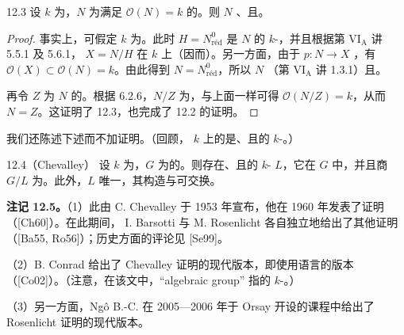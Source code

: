 \begin{SGAresult}{}{12.3}
设 $k$ 为，$N$ 为满足 $\mathcal O(N)=k$ 的。则 $N$ 、且。
\end{SGAresult}
\begin{proof}
事实上，可假定 $k$ 为。此时 $H=N^0_{\mathrm{r\text{é}d}}$ 是 $N$ 的 $k$-，并且根据第 VI$_{\mathrm A}$ 讲 5.5.1 及 5.6.1， $X=N/H$ 在 $k$ 上（因而）。另一方面，由于 $p:N\to X$ ，有 $\mathcal O(X)\subset\mathcal O(N)=k$。由此得到 $N=N^0_{\mathrm{r\text{é}d}}$，所以 $N$ （第 VI$_{\mathrm A}$ 讲 1.3.1）且。

再令 $Z$ 为 $N$ 的。根据 6.2.6，$N/Z$ 为，与上面一样可得 $\mathcal O(N/Z)=k$，从而 $N=Z$。这证明了 12.3，也完成了 12.2 的证明。
\end{proof}

我们还陈述下述而不加证明。（回顾， $k$ 上的是、且的 $k$-。）

\begin{SGAresult}{}{12.4（Chevalley）}
设 $k$ 为，$G$ 为的。则存在、且的 $k$- $L$，它在 $G$ 中，并且商 $G/L$ 为。此外，$L$ 唯一，其构造与可交换。
\end{SGAresult}

\textbf{注记 12.5。}（1）此由 C. Chevalley 于 1953 年宣布，他在 1960 年发表了证明（[Ch60]）。在此期间，
I. Barsotti 与 M. Rosenlicht 各自独立地给出了其他证明（[Ba55, Ro56]）；历史方面的评论见 [Se99]。

（2）B. Conrad 给出了 Chevalley 证明的现代版本，即使用语言的版本（[Co02]）。（注意，在该文中，“algebraic group” 指的 $k$-。）

（3）另一方面，Ngô B.-C. 在 2005—2006 年于 Orsay 开设的课程中给出了 Rosenlicht 证明的现代版本。

